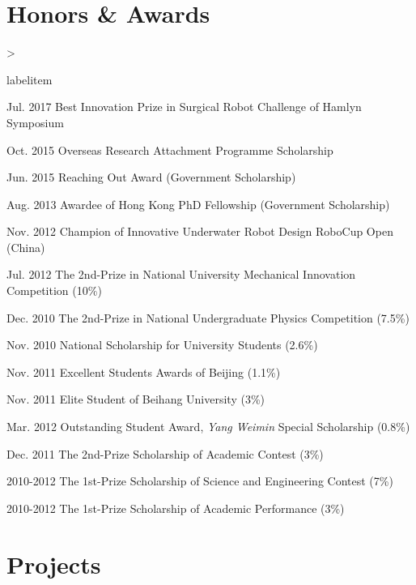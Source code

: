 \documentclass[10pt,letterpaper]{article}
\makeatletter
\newenvironment{dateitemize}%
{\ifnum \@itemdepth >\thr@@\@toodeep\else
\advance\@itemdepth\@ne
\edef\@itemitem{labelitem\romannumeral\the\@itemdepth}%
\expandafter
\list
\csname\@itemitem\endcsname
{\advance\rightmargin3cm
\def\makelabel##1{\hss\llap{\textbullet}\rlap{\hbox to \dimexpr\linewidth+\rightmargin+\itemsep\relax{\hss##1}}}}%
\fi}
{\endlist}%
\makeatother
\begin{document}
\section*{Honors \& Awards}

\begin{dateitemize}
    \item[Jul. 2017] Best Innovation Prize in Surgical Robot Challenge of Hamlyn Symposium
    \item[Oct. 2015] Overseas Research Attachment Programme Scholarship
    \item[Jun. 2015] Reaching Out Award (Government Scholarship)
    \item[Aug. 2013] Awardee of Hong Kong PhD Fellowship (Government Scholarship)
    \item[Nov. 2012] Champion of Innovative Underwater Robot Design RoboCup Open (China)
    \item[Jul. 2012] The 2nd-Prize in National University Mechanical Innovation Competition (10\%)
    \item[Dec. 2010] The 2nd-Prize in National Undergraduate Physics Competition (7.5\%)
    \item[Nov. 2010] National Scholarship for University Students (2.6\%)
    \item[Nov. 2011] Excellent Students Awards of Beijing (1.1\%)
    \item[Nov. 2011] Elite Student of Beihang University (3\%)
    \item[Mar. 2012] Outstanding Student Award, \textit{Yang Weimin} Special Scholarship (0.8\%)
    \item[Dec. 2011] The 2nd-Prize Scholarship of Academic Contest (3\%)
    \item[2010-2012] The 1st-Prize Scholarship of Science and Engineering Contest (7\%)
    \item[2010-2012] The 1st-Prize Scholarship of Academic Performance (3\%)

\end{dateitemize}

\section*{Projects}
\end{document}
